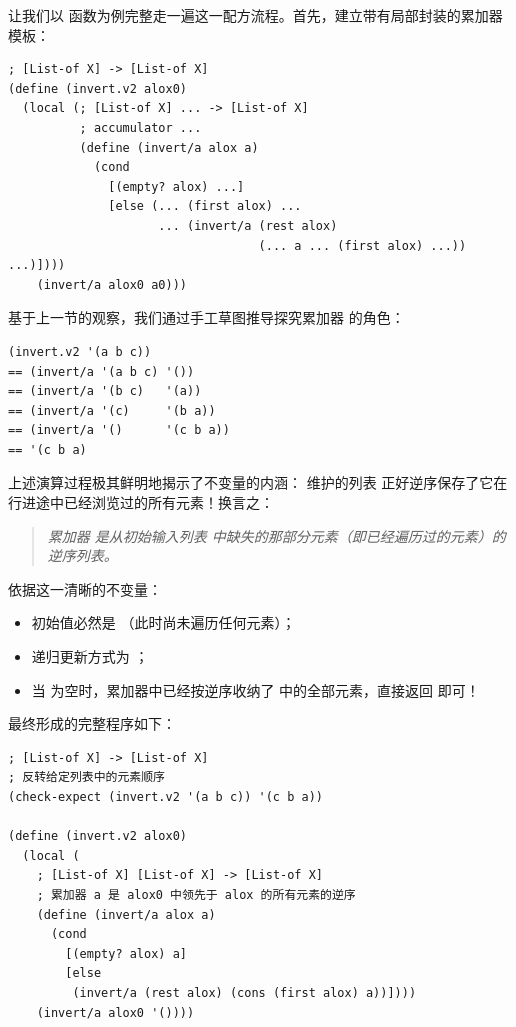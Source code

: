 让我们以  函数为例完整走一遍这一配方流程。首先，建立带有局部封装的累加器模板：

\begin{lstlisting}[language=BSL]
; [List-of X] -> [List-of X]
(define (invert.v2 alox0)
  (local (; [List-of X] ... -> [List-of X]
          ; accumulator ...
          (define (invert/a alox a)
            (cond
              [(empty? alox) ...]
              [else (... (first alox) ...
                     ... (invert/a (rest alox)
                                   (... a ... (first alox) ...)) ...)])))
    (invert/a alox0 a0)))
\end{lstlisting}

基于上一节的观察，我们通过手工草图推导探究累加器  的角色：

\begin{lstlisting}[language=BSL]
   (invert.v2 '(a b c))
== (invert/a '(a b c) '())
== (invert/a '(b c)   '(a))
== (invert/a '(c)     '(b a))
== (invert/a '()      '(c b a))
== '(c b a)
\end{lstlisting}

上述演算过程极其鲜明地揭示了不变量的内涵： 维护的列表  正好逆序保存了它在行进途中已经浏览过的所有元素！换言之：
\begin{quote}
\textit{累加器  是从初始输入列表  中缺失的那部分元素（即已经遍历过的元素）的逆序列表。}
\end{quote}

依据这一清晰的不变量：
\begin{itemize}
  \item 初始值必然是 \code{\textquotesingle()}（此时尚未遍历任何元素）；
  \item 递归更新方式为 ；
  \item 当  为空时，累加器中已经按逆序收纳了  中的全部元素，直接返回  即可！
\end{itemize}

最终形成的完整程序如下：

\begin{lstlisting}[language=BSL]
; [List-of X] -> [List-of X]
; 反转给定列表中的元素顺序
(check-expect (invert.v2 '(a b c)) '(c b a))

(define (invert.v2 alox0)
  (local (
    ; [List-of X] [List-of X] -> [List-of X]
    ; 累加器 a 是 alox0 中领先于 alox 的所有元素的逆序
    (define (invert/a alox a)
      (cond
        [(empty? alox) a]
        [else
         (invert/a (rest alox) (cons (first alox) a))])))
    (invert/a alox0 '())))
\end{lstlisting}

